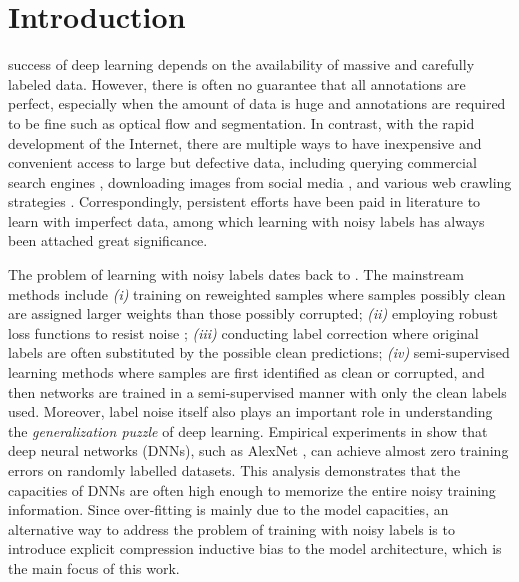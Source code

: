 \documentclass[journal]{IEEEtran}
\begin{document}
\section{Introduction} \label{sec::introduction}
 success of deep learning depends on the availability of massive and carefully labeled data. 
However, there is often no guarantee that all annotations are perfect, especially when the amount of data is huge and annotations are required to be fine such as optical flow and segmentation.
In contrast, with the rapid development of the Internet, there are multiple ways to have inexpensive and convenient access to large but defective data, including querying commercial search engines \cite{li2017webvision}, downloading images from social media \cite{mahajan2018exploring}, and various web crawling strategies \cite{olston2010web}.
Correspondingly, persistent efforts have been paid in literature to learn with imperfect data, among which learning with noisy labels has always been attached great significance.

The problem of learning with noisy labels dates back to \cite{angluin1988learning, quinlan1986induction}.
The mainstream methods include 
\textit{(i)}
training on reweighted samples \cite{han2018co, jiang2018mentornet, malach2017decoupling, yu2019does, wei2020combating} where samples possibly clean are assigned larger weights than those possibly corrupted;
\textit{(ii)} 
employing robust loss functions to resist noise \cite{patrini2017making, natarajan2013learning, reed2014training, goldberger2017training};
\textit{(iii)}
conducting label correction \cite{tanaka2018joint, yi2019probabilistic, zhang2021learning} where original labels are often substituted by the possible clean predictions;
\textit{(iv)}
semi-supervised learning methods
\cite{ding2018semi,kong2019recycling,li2020dividemix}
where samples are first identified as clean or corrupted, and then networks are trained in a semi-supervised manner with only the clean labels used.
Moreover, label noise itself also plays an important role in understanding the \textit{generalization puzzle} of deep learning.
Empirical experiments in \cite{zhang2017understanding} show that deep neural networks (DNNs), such as AlexNet \cite{krizhevsky2012imagenet}, can achieve almost zero training errors on randomly labelled datasets.
This analysis demonstrates that the capacities of DNNs are often high enough to memorize the entire noisy training information.
Since over-fitting is mainly due to the model capacities, an alternative way to address the problem of training with noisy labels is to introduce explicit compression inductive bias to the model architecture, which is the main focus of this work.
\end{document}
